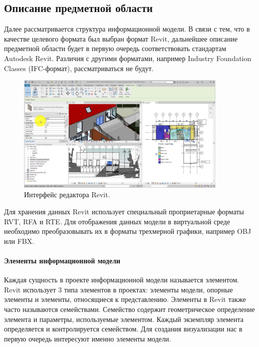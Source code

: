 ﻿\subsection{Описание предметной области}
\label{subsections:DomainModel}

Далее рассматривается структура информационной модели.
В связи с тем, что в качестве целевого формата был выбран  формат Revit,
дальнейшее описание предметной области будет в первую очередь
соответствовать стандартам Autodesk Revit.
Различия с другими форматами, например Industry Foundation Classes (IFC-формат),%
\cite{BuildingSmartIFC}
рассматриваться не будут.

\begin{figure}[ht]
    \centering
    \includegraphics[width=0.9\textwidth, frame]{images/Revit-interface.jpg}
    \caption{Интерфейс редактора Revit.%
    \cite{DocRevit}}
    \label{figure:RevitInterface}
\end{figure}

Для хранения данных Revit использует специальный проприетарные форматы RVT, RFA и RTE.
Для отображения данных модели в виртуальной среде необходимо
преобразовывать их в форматы трехмерной графики, например OBJ или FBX.

\paragraph{Элементы информационной модели}

Каждая сущность в проекте информационной модели называется элементом.
Revit использует 3 типа элементов в проектах:
элементы модели, опорные элементы и элементы, относящиеся к представлению.
Элементы в Revit также часто называются семействами.
Семейство содержит геометрическое определение элемента и
параметры, используемые элементом.
Каждый экземпляр элемента определяется и контролируется семейством.%
\cite{DocRevit}
Для создания визуализации нас в первую очередь интересуют
именно элементы модели.

